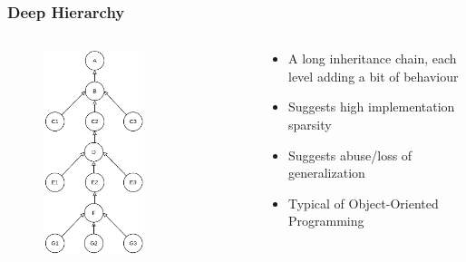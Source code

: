 \documentclass[dvipsnames, 10pt]{beamer}
\begin{document}
\begin{frame}
  \frametitle{Deep Hierarchy}
  \begin{columns}
    \begin{column}{0.5\textwidth}
      \begin{figure}
        \begin{center}
          \includegraphics[width=0.6\textwidth]{figures/architectural-smells/deep-hierarchy.png}
        \end{center}
      \end{figure}
    \end{column}
    \begin{column}{0.5\textwidth}
      \begin{itemize}
        \item A long inheritance chain, each level adding a bit of behaviour
        \item Suggests high implementation sparsity
        \item Suggests abuse/loss of generalization
        \item Typical of Object-Oriented Programming
      \end{itemize}
    \end{column}
  \end{columns}
\end{frame}
\end{document}
